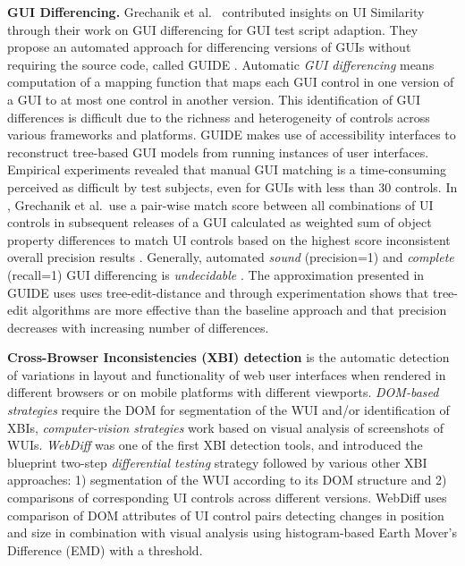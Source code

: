\textbf{GUI Differencing.} Grechanik et al.~\autocite{Grechanik2018,Grechanik2009ICSE,Grechanik2009ICSM} contributed insights on UI Similarity through their work on GUI differencing for GUI test script adaption.
They propose an automated approach for differencing versions of GUIs without requiring the source code, called GUIDE \autocite{Grechanik2018}.
Automatic \emph{GUI differencing} means computation of a mapping function that maps each GUI control in one version of a GUI to at most one control in another version.
This identification of GUI differences is difficult due to the richness and heterogeneity of controls across various frameworks and platforms.
GUIDE makes use of accessibility interfaces to reconstruct tree-based GUI models from running instances of user interfaces.
Empirical experiments \autocite{Grechanik2009ICSM} revealed that manual GUI matching is a time-consuming perceived as difficult by test subjects, even for GUIs with less than 30 controls.
In \autocite{Grechanik2009ICSE}, Grechanik et al.~use a pair-wise match score between all combinations of UI controls in subsequent releases of a GUI calculated as weighted sum of object property differences to match UI controls based on the highest score inconsistent overall precision results \autocite{Grechanik2018}.
Generally, automated \emph{sound} (precision=1) and \emph{complete} (recall=1) GUI differencing is \emph{undecidable} \autocite{Grechanik2018}.
The approximation presented in GUIDE uses uses tree-edit-distance and through experimentation shows that tree-edit algorithms are more effective than the baseline approach and that precision decreases with increasing number of differences.

\textbf{Cross-Browser Inconsistencies (XBI) detection} is the automatic detection of variations in layout and functionality of web user interfaces when rendered in different browsers or on mobile platforms with different viewports.
\emph{DOM-based strategies} \autocite{Watanabe2018,RoyChoudhary2014XPERT,RoyChoudhary2010WebDiff} require the DOM for segmentation of the WUI and/or identification of XBIs, \emph{computer-vision strategies} \autocite{Saar2016Browserbite} work based on visual analysis of screenshots of WUIs.
\emph{WebDiff} \autocite{RoyChoudhary2010WebDiff} was one of the first XBI detection tools, and introduced the blueprint two-step \emph{differential testing} \autocite{Mckeeman1998DifferentialTesting} strategy followed by various other XBI approaches: 1) segmentation of the WUI according to its DOM structure and 2) comparisons of corresponding UI controls across different versions.
WebDiff uses comparison of DOM attributes of UI control pairs detecting changes in position and size in combination with visual analysis using histogram-based Earth Mover's Difference (EMD) \autocite{Rubner1998EMD} with a threshold.

